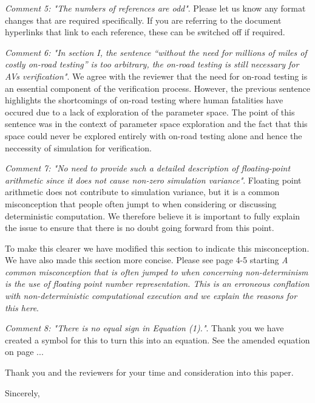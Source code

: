 \documentclass[11pt, a4paper]{letter} %
\renewcommand{\closing}[1]{
	\vspace{2.5mm} %
	\noindent %
	\hspace*{\longindentation} %
	\parbox{\indentedwidth}{
		\raggedright
		#1 %
		\vskip 1.65cm %
		\fromsig %
	}
}
\begin{document}
\begin{letter}
\textit{Comment 5: "The numbers of references are odd"}.
Please let us know any format changes that are required specifically. If you are referring to the document hyperlinks that link to each reference, these can be switched off if required.

\textit{Comment 6: "In section I, the sentence “without the need for millions of miles of costly on-road testing” is too arbitrary, the on-road testing is still necessary for AVs verification"}.
We agree with the reviewer that the need for on-road testing is an essential component of the verification process. However, the previous sentence highlights the shortcomings of on-road testing where human fatalities have occured due to a lack of exploration of the parameter space.
The point of this sentence  was in the context of parameter space exploration and the fact that this space could never be explored entirely with on-road testing alone and hence the neccessity of simulation for verification.

\textit{Comment 7: "No need to provide such a detailed description of floating-point arithmetic since it does not cause non-zero simulation variance"}.
Floating point arithmetic does not contribute to simulation variance, but it is a common misconception that people often jumpt to when considering or discussing deterministic computation. We therefore believe it is important to fully explain the issue to ensure that there is no doubt going forward from this point.

To make this clearer we have modified this section to indicate this misconception. We have also made this section more concise. Please see page 4-5 starting \textit{A common misconception that is often jumped to when concerning non-determinism is the use of floating point number representation. This is an erroneous conflation with non-deterministic computational execution and we explain the reasons for this here}.

\textit{Comment 8: "There is no equal sign in Equation (1)."}.
Thank you we have created a symbol for this to turn this into an equation. See the amended equation on page ...










Thank you and the reviewers for your time and consideration into this paper. 

\closing{Sincerely,}




\end{letter}
\end{document}
